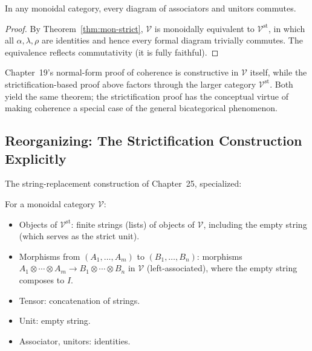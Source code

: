 \begin{corollary}
\label{cor:maclane-from-strict}
In any monoidal category, every diagram of associators and unitors commutes.
\end{corollary}

\begin{proof}
By Theorem~\ref{thm:mon-strict}, $\mathcal{V}$ is monoidally equivalent to
$\mathcal{V}^{\mathrm{st}}$, in which all $\alpha, \lambda, \rho$ are
identities and hence every formal diagram trivially commutes. The
equivalence reflects commutativity (it is fully faithful).
\end{proof}

\begin{remark}
Chapter~19's normal-form proof of coherence is constructive in $\mathcal{V}$
itself, while the strictification-based proof above factors through the
larger category $\mathcal{V}^{\mathrm{st}}$. Both yield the same theorem;
the strictification proof has the conceptual virtue of making coherence a
special case of the general bicategorical phenomenon.
\end{remark}

\subsection{Reorganizing: The Strictification Construction Explicitly}

The string-replacement construction of Chapter~25, specialized:

\begin{definition}
\label{def:explicit-strict}
For a monoidal category $\mathcal{V}$:
\begin{itemize}
  \item Objects of $\mathcal{V}^{\mathrm{st}}$: finite strings (lists) of
        objects of $\mathcal{V}$, including the empty string (which serves as
        the strict unit).
  \item Morphisms from $(A_1, \ldots, A_m)$ to $(B_1, \ldots, B_n)$: morphisms
        $A_1 \otimes \cdots \otimes A_m \to B_1 \otimes \cdots \otimes B_n$
        in $\mathcal{V}$ (left-associated), where the empty string composes
        to $I$.
  \item Tensor: concatenation of strings.
  \item Unit: empty string.
  \item Associator, unitors: identities.
\end{itemize}
\end{definition}

